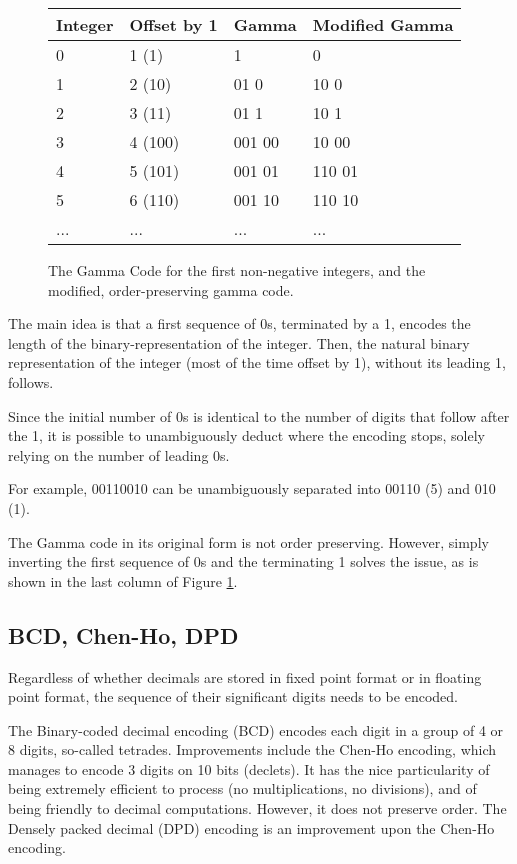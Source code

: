 \documentclass{acm_proc_article-sp}
\begin{document}
\begin{figure}[p]
\caption{The Gamma Code for the first non-negative integers, and the modified, order-preserving gamma code.}
\label{figure-gamma-encoding}
\center
\begin{tabular}{|l|l|l|l|}
\hline
Integer & Offset by 1 & Gamma & Modified Gamma \\
\hline
0 & 1 (1) & 1 & 0\\
\hline
1 & 2 (10) & 01 0 & 10 0 \\
\hline
2 & 3 (11) & 01 1  & 10 1\\
\hline
3 & 4 (100) & 001 00 & 10 00\\
\hline
4 & 5 (101) & 001 01 & 110 01\\
\hline
5 & 6 (110) & 001 10 & 110 10\\
\hline
... & ... & ... & ... \\
\hline
\end{tabular}
\end{figure}

 The main idea is that a first sequence of 0s, terminated by a 1, encodes the length of the binary-representation of the integer. Then, the natural binary representation of the integer (most of the time offset by 1), without its leading 1, follows.

Since the initial number of 0s is identical to the number of digits that follow after the 1, it is possible to unambiguously deduct where the encoding stops, solely relying on the number of leading 0s.

For example, 00110010 can be unambiguously separated into 00110 (5) and 010 (1).

The Gamma code in its original form is not order preserving. However, simply inverting the first sequence of 0s and the terminating 1 solves the issue, as is shown in the last column of Figure \ref{figure-gamma-encoding}.

\subsection{BCD, Chen-Ho, DPD}

Regardless of whether decimals are stored in fixed point format or in floating point format, the sequence of their significant digits needs to be encoded.

The Binary-coded decimal encoding (BCD) encodes each digit in a group of 4 or 8 digits, so-called tetrades. Improvements include the Chen-Ho \cite{ChenHo} encoding, which manages to encode 3 digits on 10 bits (declets). It has the nice particularity of being extremely efficient to process (no multiplications, no divisions), and of being friendly to decimal computations. However, it does not preserve order. The Densely packed decimal (DPD) encoding \cite{DPD} is an improvement upon the Chen-Ho encoding.
\end{document}
